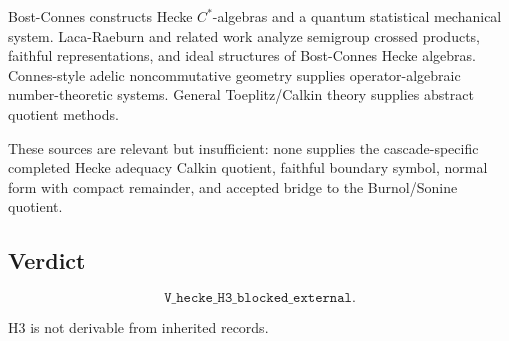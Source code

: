 Bost-Connes constructs Hecke \(C^*\)-algebras and a quantum statistical
mechanical system. Laca-Raeburn and related work analyze semigroup crossed
products, faithful representations, and ideal structures of Bost-Connes
Hecke algebras. Connes-style adelic noncommutative geometry supplies
operator-algebraic number-theoretic systems. General Toeplitz/Calkin theory
supplies abstract quotient methods.

These sources are relevant but insufficient: none supplies the cascade-specific
completed Hecke adequacy Calkin quotient, faithful boundary symbol, normal form
with compact remainder, and accepted bridge to the Burnol/Sonine quotient.

\subsection*{Verdict}

\[
\texttt{V\_hecke\_H3\_blocked\_external}.
\]

H3 is not derivable from inherited records.
